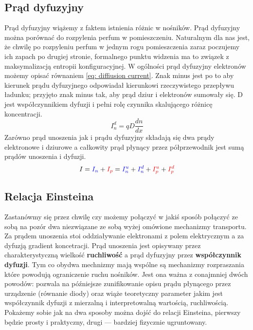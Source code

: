     \subsection{Prąd dyfuzyjny}
        Prąd dyfuzyjny wiążemy z faktem istnienia różnic w  nośników. Prąd dyfuzyjny można porównać do rozpylenia perfum w pomieszczeniu. Naturalnym dla nas jest, że chwilę po rozpyleniu perfum w jednym rogu pomieszczenia zaraz
        poczujemy ich zapach po drugiej stronie, formalnego punktu widzenia ma to związek z maksymalizacją entropii konfiguracyjnej. W ogólności prąd dyfuzyjny elektronów możemy opisać równaniem \ref{eq: diffiusion current}. Znak minus jest po to aby kierunek prądu dyfuzyjnego odpowiadał kierunkowi rzeczywistego przepływu ładunku; przyjęto znak minus tak, aby prąd dziur i elektronów sumowały się. D jest współczynnikiem dyfuzji i pełni rolę czynnika skalującego różnicę koncentracji. 
        \begin{equation}
            I_n^d = qD\frac{dn}{dx} \label{eq: diffiusion current}
        \end{equation}
        Zarówno prąd unoszenia jak i prądu dyfuzyjny składają się dwa prądy elektronowe i dziurowe a całkowity prąd płynący przez półprzewodnik jest sumą prądów unoszenia i dyfuzji. 
        \begin{equation}
            I = \textcolor{blue}{I_n} +\textcolor{red}{I_p} =\textcolor{blue}{I_n^u} +\textcolor{blue}{I_n^d} +\textcolor{red}{I_p^u} + \textcolor{red}{I_p^d}
        \end{equation}
    
    \subsection{Relacja Einsteina}
        Zastanówmy się przez chwilę czy możemy połączyć w jakiś sposób połączyć ze sobą na pozór dwa niezwiązane ze sobą wyżej omówione mechanizmy transportu. Za prądem unoszenia stoi oddziaływanie elektronami z polem elektrycznym a za dyfuzją gradient koncetracji. Prąd unoszenia jest opisywany przez charakterystyczną wielkość \textbf{ruchliwość} a prąd dyfuzyjny przez \textbf{współczynnik dyfuzji}. Tym co obydwa mechnizmy mają wspólne są mechanizmy rozpraszania które powodują ograniczenie ruchu nośników. Jest ona ważna z conajmniej dwóch powodów: pozwala na późniejsze zunifikowanie opisu prądu płynącego przez urządzenie (równanie diody) oraz wiąże teoretyczny parameter jakim jest współczynnik dyfuzji z mierzalną i interpretowalną wartością, ruchliwością. Pokażemy sobie jak na dwa sposoby można dojść do relacji Einsteina, pierwszy będzie prosty i praktyczny, drugi — bardziej fizycznie ugruntowany. 

